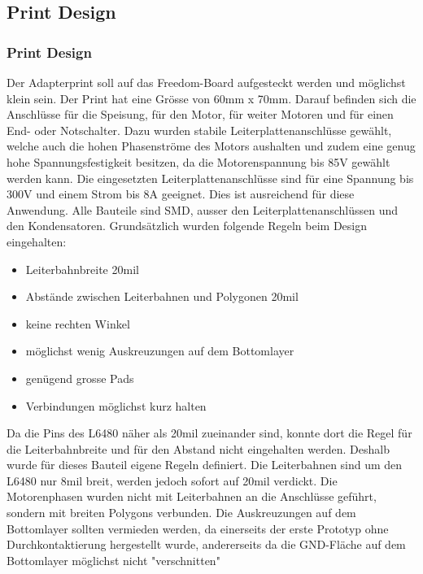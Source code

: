     \subsection{Print Design} \label{sec:PrintDesign}   
    \fi
    \ifEMBED
    \subsubsection{Print Design} \label{sec:PrintDesigna}
    \fi
    Der Adapterprint soll auf das Freedom-Board aufgesteckt werden und 
    möglichst klein sein. Der Print hat eine Grösse von 60mm x 70mm. Darauf 
    befinden sich die Anschlüsse für die Speisung, für den Motor, für weiter 
    Motoren und für einen End- oder Notschalter. Dazu wurden stabile 
    Leiterplattenanschlüsse gewählt, welche auch die hohen Phasenströme des 
    Motors aushalten und zudem eine genug hohe Spannungsfestigkeit besitzen, 
    da die Motorenspannung bis 85V gewählt werden kann. Die eingesetzten 
    Leiterplattenanschlüsse sind für eine Spannung bis 300V und einem Strom 
    bis 8A geeignet. Dies ist ausreichend für diese Anwendung. Alle Bauteile 
    sind SMD, ausser den Leiterplattenanschlüssen und den Kondensatoren.
    \newpage
    Grundsätzlich wurden folgende Regeln beim Design eingehalten: 
    \begin{itemize}
        \item Leiterbahnbreite 20mil
        \item Abstände zwischen Leiterbahnen und Polygonen 20mil
        \item keine rechten Winkel
        \item möglichst wenig Auskreuzungen auf dem Bottomlayer
        \item genügend grosse Pads 
        \item Verbindungen möglichst kurz halten
    \end{itemize}
    Da die Pins des L6480 näher als 20mil zueinander sind, konnte dort die 
    Regel für die Leiterbahnbreite und für den Abstand nicht eingehalten 
    werden. Deshalb wurde für dieses Bauteil eigene Regeln definiert. Die 
    Leiterbahnen sind um den L6480 nur 8mil breit, werden jedoch sofort auf 
    20mil verdickt. Die Motorenphasen wurden nicht mit Leiterbahnen an die 
    Anschlüsse geführt, sondern mit breiten Polygons verbunden. Die 
    Auskreuzungen auf dem Bottomlayer sollten vermieden werden, da einerseits 
    der erste Prototyp ohne Durchkontaktierung hergestellt wurde, andererseits 
    da die GND-Fläche auf dem Bottomlayer möglichst nicht "verschnitten" 
